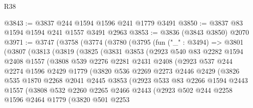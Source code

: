 \begin{lexlean}{R38}
\begin{coremodule}
@3843 := @3837 @244 @1594 @1596 @241 @1779 @3491
@3850 := @3837 @83 @1594 @1594 @241 @1557 @3491 @2963
@3853 := @3836 (@3843 @3850) @2070
@3971 := @3747
    (@3758
      (@3774
        (@3780
          (@3795
            (fun ("_" : @3494) =>
            @3801
              (@3807
                (@3813
                  (@3819
                    (@3825
                      (@3831
                        @3853
                        (@2923
                          @540
                          @83
                          @2282
                          @1594
                          @2408
                          @1557
                          (@3808
                            @539
                            @2276
                            @2281
                            @2431
                            @2408
                            (@2923
                              @537
                              @244
                              @2274
                              @1596
                              @2429
                              @1779
                              (@3820
                                @536
                                @2269
                                @2273
                                @2446
                                @2429
                                (@3826
                                  @535
                                  @1870
                                  @2268
                                  @2041
                                  @2445
                                  @3853
                                  (@2923
                                    @533
                                    @83
                                    @2266
                                    @1594
                                    @2443
                                    @1557
                                    (@3808
                                      @532
                                      @2260
                                      @2265
                                      @2466
                                      @2443
                                      (@2923
                                        @502
                                        @244
                                        @2258
                                        @1596
                                        @2464
                                        @1779
                                        (@3820
                                          @501
                                          @2253

\end{coremodule}
\end{lexlean}
